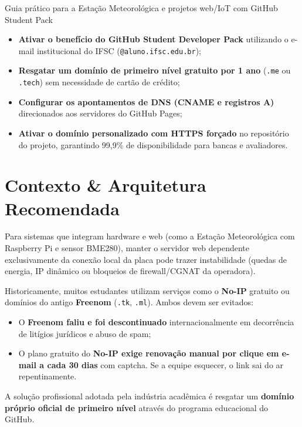   {Guia prático para a Estação Meteorológica e projetos web/IoT com GitHub Student Pack}
  {\hspace{4pt}
   \hspace{4pt}
   }

\vspace{0.4em}

\begin{boxObjetivos}
\begin{itemize}
  \item \textbf{Ativar o benefício do GitHub Student Developer Pack} utilizando o e-mail institucional do IFSC (\texttt{@aluno.ifsc.edu.br});
  \item \textbf{Resgatar um domínio de primeiro nível gratuito por 1 ano} (\texttt{.me} ou \texttt{.tech}) sem necessidade de cartão de crédito;
  \item \textbf{Configurar os apontamentos de DNS (CNAME e registros A)} direcionados aos servidores do GitHub Pages;
  \item \textbf{Ativar o domínio personalizado com HTTPS forçado} no repositório do projeto, garantindo 99,9\% de disponibilidade para bancas e avaliadores.
\end{itemize}
\end{boxObjetivos}

\section{Contexto \& Arquitetura Recomendada}

Para sistemas que integram hardware e web (como a Estação Meteorológica com Raspberry Pi e sensor BME280), manter o servidor web dependente exclusivamente da conexão local da placa pode trazer instabilidade (quedas de energia, IP dinâmico ou bloqueios de firewall/CGNAT da operadora).

\begin{boxAtencao}
Historicamente, muitos estudantes utilizam serviços como o \textbf{No-IP} gratuito ou domínios do antigo \textbf{Freenom} (\texttt{.tk}, \texttt{.ml}). Ambos devem ser evitados:
\begin{itemize}
  \item O \textbf{Freenom faliu e foi descontinuado} internacionalmente em decorrência de litígios jurídicos e abuso de spam;
  \item O plano gratuito do \textbf{No-IP exige renovação manual por clique em e-mail a cada 30 dias} com captcha. Se a equipe esquecer, o link sai do ar repentinamente.
\end{itemize}
A solução profissional adotada pela indústria acadêmica é resgatar um \textbf{domínio próprio oficial de primeiro nível} através do programa educacional do GitHub.
\end{boxAtencao}


